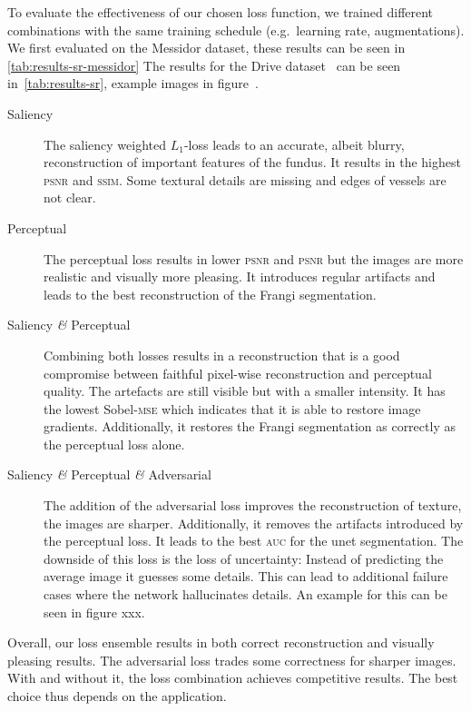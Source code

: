 \documentclass{scrartcl}
\begin{document}
To evaluate the effectiveness of our chosen loss function, we trained different combinations with the same training schedule (e.g.\ learning rate, augmentations).
We first evaluated on the Messidor dataset, these results can be seen in \cref{tab:results-sr-messidor}
The results for the Drive dataset~\cite{Drive} can be seen in~\cref{tab:results-sr}, example images in figure~.
\begin{description}
\item[Saliency] The saliency weighted $L_1$-loss leads to an accurate, albeit blurry, reconstruction of important features of the fundus.
  It results in the highest \textsc{psnr} and \textsc{ssim}.
  Some textural details are missing and edges of vessels are not clear.
\item[Perceptual] The perceptual loss results in lower \textsc{psnr} and \textsc{psnr} but the images are more realistic and visually more pleasing.
  It introduces regular artifacts and leads to the best reconstruction of the Frangi segmentation.
\item[Saliency \textit{\&} Perceptual] Combining both losses results in a reconstruction that is a good compromise between faithful pixel-wise reconstruction and perceptual quality.
  The artefacts are still visible but with a smaller intensity.
  It has the lowest Sobel-\textsc{mse} which indicates that it is able to restore image gradients.
  Additionally, it restores the Frangi segmentation as correctly as the perceptual loss alone.
\item[Saliency \textit{\&} Perceptual \textit{\&} Adversarial]
  The addition of the adversarial loss improves the reconstruction of texture, the images are sharper.
  Additionally, it removes the artifacts introduced by the perceptual loss.
  It leads to the best \textsc{auc} for the unet segmentation.
  The downside of this loss is the loss of uncertainty:
  Instead of predicting the average image it guesses some details.
  This can lead to additional failure cases where the network hallucinates details.
  An example for this can be seen in figure xxx.
\end{description}
Overall, our loss ensemble results in both correct reconstruction and visually pleasing results.
The adversarial loss trades some correctness for sharper images.
With and without it, the loss combination achieves competitive results.
The best choice thus depends on the application.
\end{document}
